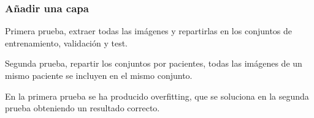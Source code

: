 \documentclass{beamer}
\begin{document}
\begin{frame}
\frametitle{Añadir una capa}

Primera prueba, extraer todas las imágenes y repartirlas en los conjuntos de entrenamiento, validación y test.
\bigskip

Segunda prueba, repartir los conjuntos por pacientes, todas las imágenes de un mismo paciente se incluyen en el mismo conjunto.

\begin{table}[H]
\centering
{}
\caption{Resultados añadir una capa.}
\end{table}

En la primera prueba se ha producido overfitting, que se soluciona en la segunda prueba obteniendo un resultado correcto.

\end{frame}
\end{document}
